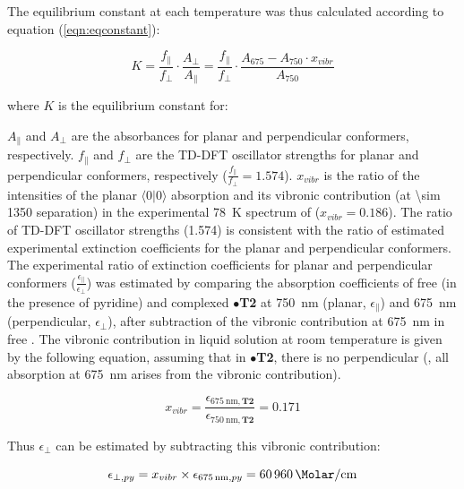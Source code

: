 		The equilibrium constant at each temperature was thus calculated according to equation (\ref{eqn:eqconstant}):

		\begin{equation}\label{eqn:eqconstant}
		K = \frac{f_\parallel}{f_\bot} \cdot \frac{A_\bot}{A_\parallel} = \frac{f_\parallel}{f_\bot} \cdot \frac{A_{675} - A_{750} \cdot x_{vibr}}{A_{750}}
		\end{equation}

		where $K$ is the equilibrium constant for:
		\begin{center}
		\end{center}

		$A_\parallel$ and $A_\bot$ are the absorbances for planar and perpendicular conformers, respectively. $f_\parallel$ and $f_\bot$ are the TD-DFT oscillator strengths for planar and perpendicular conformers, respectively ($\frac{f_\parallel}{f_\bot} = 1.574$). $x_{vibr}$ is the ratio of the intensities of the planar $\langle0|0\rangle$ absorption and its vibronic contribution (at \SI{\sim 1350}{\wn} separation) in the experimental \SI{78}{\kelvin} spectrum of  ($x_{vibr} = 0.186$). The ratio of TD-DFT oscillator strengths (1.574) is consistent with the ratio of estimated experimental extinction coefficients for the planar and perpendicular conformers. The experimental ratio of extinction coefficients for planar and perpendicular conformers ($\frac{\epsilon_{\parallel}}{\epsilon_{\bot}}$) was estimated by comparing the absorption coefficients of free  (in the presence of pyridine) and complexed $\bullet$\textbf{T2} at \SI{750}{\nano\metre} (planar, $\epsilon_{\parallel}$) and \SI{675}{\nano\metre} (perpendicular, $\epsilon_{\bot}$), after subtraction of the vibronic contribution at \SI{675}{\nano\metre} in free . The vibronic contribution in liquid solution at room temperature is given by the following equation, assuming that in $\bullet$\textbf{T2}, there is no perpendicular  (, all absorption at \SI{675}{\nano\metre} arises from the vibronic contribution).

		\begin{equation}
			x_{vibr}= \frac{\epsilon_{\SI{675}{\nano\metre}, \textbf{T2}}}{\epsilon_{\SI{750}{\nano\metre}, \textbf{T2}}} = 0.171
		\end{equation}

		Thus $\epsilon_\bot$ can be estimated by subtracting this vibronic contribution:

		\begin{equation}
			\epsilon_{\bot, py} = x_{vibr} \times \epsilon_{\SI{675}{\nano\metre}, py} = \SI{60960}{\per\Molar\per\centi\metre} 
		\end{equation}

